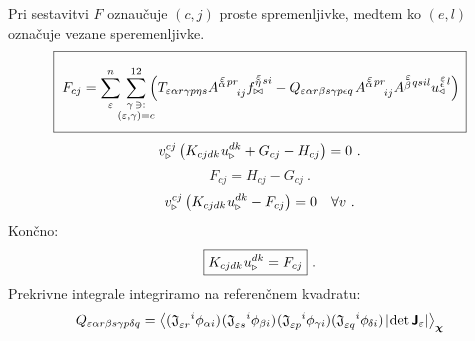\vspace{1mm}
Pri sestavitvi $F$ oznaučuje $(c, j)$ proste spremenljivke, medtem ko $(e, l)$ označuje vezane speremenljivke.
\vspace{-1mm}
\begin{equation}
   \boxed{ \phantom{\rule[-9mm]{1mm}{18mm}}
   F_{c j} =
   \sum^n_\varepsilon
   \mkern-7mu
   \sum_{\substack{\gamma \, \ni: \\
      (\varepsilon,\gamma) = c}}^{12}
   \mkern-10mu
   \qty(
   T_{\varepsilon   \alpha r   \gamma p   \eta s}
   A^{\substack{\mkern2mu \varepsilon \\[-0.65mm] \alpha} \mkern2mu p r}_{\mkern29mu i j}
   f^{\substack{\mkern2mu \varepsilon \\[-0.59mm] \eta} \mkern2mu s i}_{\bowtie}
   -
   Q_{\varepsilon   \alpha r   \beta s   \gamma p   \epsilon q} \mkern2mu
   A^{\substack{\mkern2mu \varepsilon \\[-0.65mm] \alpha} \mkern2mu p r}_{\mkern29mu i j}
   A^{\substack{\mkern2mu \varepsilon \\[0.05mm] \beta} \mkern2mu q s i l}
   u^{\substack{\mkern2mu \varepsilon \\[-0.55mm] \epsilon} \mkern2mu l}_\triangleleft ) \mkern3mu }
\end{equation}
\begin{equation*}
   v^{c j}_{\triangleright} \left(
   K_{c j d k} \mkern1mu u^{d k}_\triangleright
   +
   G_{c j}
   -
   H_{c j}
   \right) = 0 \ .
\end{equation*}
\begin{equation*}
   F_{c j} = H_{c j} - G_{c j} \ .
\end{equation*}
\begin{equation*}
   v^{c j}_{\triangleright} \left(
   K_{c j d k} \mkern1mu u^{d k}_\triangleright
   -
   F_{c j}
   \right) = 0 \quad \forall v \ .
\end{equation*}
Končno:
\begin{equation}
   \boxed{
   K_{c j d k} \mkern1mu u^{d k}_\triangleright
   =
   F_{c j} } \ .
\end{equation}
Prekrivne integrale integriramo na referenčnem kvadratu:
\begin{equation}
   Q_{\varepsilon  \alpha r \beta s \gamma p \delta q}
   =
   \expval{
      ( \mathfrak{J}_{\varepsilon r}^{\mkern18mu i} \phi_{\alpha i}) \mkern1mu
      ( \mathfrak{J}_{\varepsilon s}^{\mkern18mu i} \phi_{\beta i} ) \mkern1mu
      ( \mathfrak{J}_{\varepsilon p}^{\mkern18mu i} \phi_{\gamma i})
      ( \mathfrak{J}_{\varepsilon q}^{\mkern18mu i} \phi_{\mkern-1mu \delta i} ) \mkern2mu
      |\mkern-2mu \det \bm{\mathsf{J}}_\varepsilon | }_{\bm{\chi}}
\end{equation}
